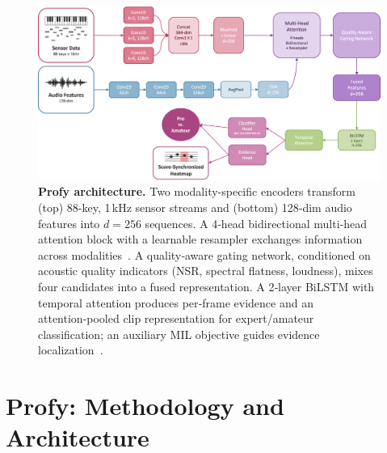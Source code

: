 \documentclass[sigconf,review,anonymous]{acmart}
\begin{document}
\begin{figure}[t]
  \centering
  \includegraphics[width=0.9\linewidth]{figures/architecture_overview.png}
  \caption{\textbf{Profy architecture.} Two modality-specific encoders transform (top) 88-key, 1\,kHz sensor streams and (bottom) 128‑dim audio features into $d{=}256$ sequences. A 4‑head bidirectional multi‑head attention block with a learnable resampler exchanges information across modalities~\cite{Vaswani2017,Lu2019ViLBERT}. A quality‑aware gating network, conditioned on acoustic quality indicators (NSR, spectral flatness, loudness), mixes four candidates into a fused representation. A 2‑layer BiLSTM with temporal attention produces per‑frame evidence and an attention‑pooled clip representation for expert/amateur classification; an auxiliary MIL objective guides evidence localization~\cite{Ilse2018,Pinheiro2015}.}
  \label{fig:architecture_overview}
\end{figure}




\section{Profy: Methodology and Architecture}
\end{document}
